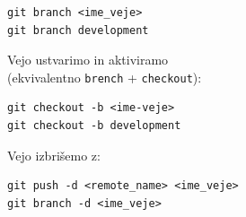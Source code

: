 \documentclass{article}
\begin{document}
\begin{multicols*}{2}
\begin{minipage}{\columnwidth}
\begin{codebox}[black]
\begin{lstlisting}
git branch <ime_veje>
git branch development
\end{lstlisting}
\end{codebox}

\begin{textbox}[black]
Vejo ustvarimo in aktiviramo\\
(ekvivalentno \lstinline{brench} + \lstinline{checkout}):
\end{textbox}

\begin{codebox}[black]
\begin{lstlisting}
git checkout -b <ime-veje>
git checkout -b development
\end{lstlisting}
\end{codebox}

\begin{textbox}[black]
Vejo izbrišemo z:
\end{textbox}

\begin{codebox}[black]
\begin{lstlisting}
git push -d <remote_name> <ime_veje>
git branch -d <ime_veje>
\end{lstlisting}
\end{codebox}
\end{minipage}






\end{multicols*}
\end{document}
